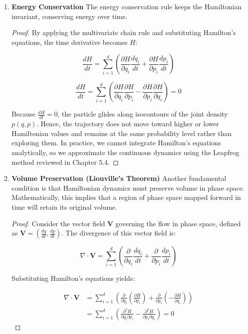 \documentclass[12pt,oneside]{report}
\theoremstyle{definition}
\theoremstyle{remark}
\begin{document}
\begin{enumerate}
	\item \textbf{Energy Conservation}
The energy conservation rule keeps the Hamiltonian invariant, conserving energy over time. 

\begin{proof} 
By applying the multivariate chain rule and substituting Hamilton's equations, the time derivative becomes $H$:

\begin{equation}
\frac{dH}{dt} = \sum_{i=1}^d \left( \frac{\partial H}{\partial q_i} \frac{dq_i}{dt} + \frac{\partial H}{\partial p_i} \frac{dp_i}{dt} \right)
\label{energy_conservation}
\end{equation}

$$\frac{dH}{dt} = \sum_{i=1}^d \left( \frac{\partial H}{\partial q_i} \frac{\partial H}{\partial p_i} - \frac{\partial H}{\partial p_i} \frac{\partial H}{\partial q_i} \right) = 0$$


Because $\frac{dH}{dt} = 0$, the particle glides along isocontours of the joint density $p(q, p)$. Hence, the trajectory does not move toward higher or lower Hamiltonian values and remains at the same probability level rather than exploring them. In practice, we cannot integrate Hamilton's equations analytically, so we approximate the continuous dynamics using the Leapfrog method reviewed in Chapter 5.4.
\end{proof}

	\item \textbf{Volume Preservation (Liouville's Theorem)}
Another fundamental condition is that Hamiltonian dynamics must preserve volume in phase space. Mathematically, this implies that a region of phase space mapped forward in time will retain its original volume. 

\begin{proof}
Consider the vector field $\mathbf{V}$ governing the flow in phase space, defined as $\mathbf{V} = \left( \frac{dq}{dt}, \frac{dp}{dt} \right)$. The divergence of this vector field is:


\begin{equation}
    \nabla \cdot \mathbf{V} = \sum_{i=1}^d \left( \frac{\partial}{\partial q_i} \frac{dq_i}{dt} + \frac{\partial}{\partial p_i} \frac{dp_i}{dt} \right)
\end{equation}


Substituting Hamilton's equations yields:


\begin{align*}
    \nabla \cdot \mathbf{V} &= \sum_{i=1}^d \left( \frac{\partial}{\partial q_i} \left( \frac{\partial H}{\partial p_i} \right) + \frac{\partial}{\partial p_i} \left( -\frac{\partial H}{\partial q_i} \right) \right) \\
    &= \sum_{i=1}^d \left( \frac{\partial^2 H}{\partial q_i \partial p_i} - \frac{\partial^2 H}{\partial p_i \partial q_i} \right) = 0
\end{align*}



\end{proof}
\end{enumerate}
\end{document}
